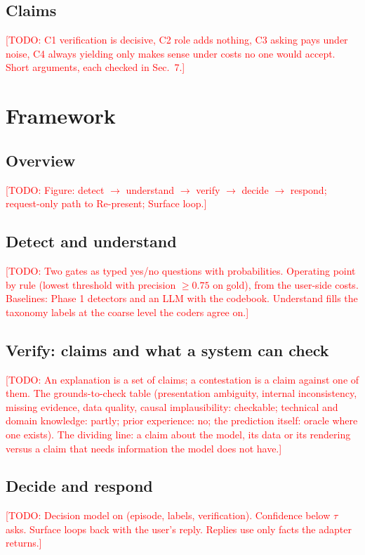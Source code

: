 \documentclass[preprint,12pt,3p,times]{elsarticle}
\newcommand{\todo}[1]{\textcolor{red}{[TODO: #1]}}
\begin{document}
\subsection{Claims}
\todo{C1 verification is decisive, C2 role adds nothing, C3 asking pays under noise, C4 always yielding only makes sense under costs no one would accept. Short arguments, each checked in Sec.~7.}

\section{Framework}  %
\subsection{Overview}
\todo{Figure: detect $\rightarrow$ understand $\rightarrow$ verify $\rightarrow$ decide $\rightarrow$ respond; request-only path to Re-present; Surface loop.}
\subsection{Detect and understand}
\todo{Two gates as typed yes/no questions with probabilities. Operating point by rule (lowest threshold with precision $\ge 0.75$ on gold), from the user-side costs. Baselines: Phase 1 detectors and an LLM with the codebook. Understand fills the taxonomy labels at the coarse level the coders agree on.}
\subsection{Verify: claims and what a system can check}
\todo{An explanation is a set of claims; a contestation is a claim against one of them. The grounds-to-check table (presentation ambiguity, internal inconsistency, missing evidence, data quality, causal implausibility: checkable; technical and domain knowledge: partly; prior experience: no; the prediction itself: oracle where one exists). The dividing line: a claim about the model, its data or its rendering versus a claim that needs information the model does not have.}
\subsection{Decide and respond}
\todo{Decision model on (episode, labels, verification). Confidence below $\tau$ asks. Surface loops back with the user's reply. Replies use only facts the adapter returns.}
\end{document}
